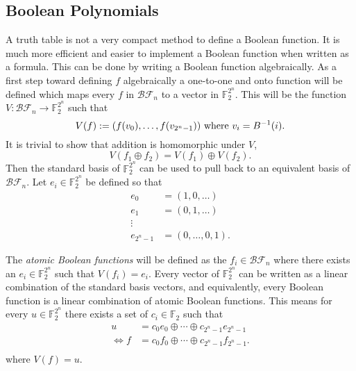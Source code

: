 \documentclass[english]{article}
\def\gftwo{\mathbb{F}_2}
\def\BF{\mathcal{BF}}
\theoremstyle{plain}
\theoremstyle{definition}
\theoremstyle{remark}
\begin{document}
\subsection{Boolean Polynomials}
\par A truth table is not a very compact method to define a Boolean
function. It is much more efficient and easier to implement a Boolean
function when written as a formula. This can be done by writing a Boolean
function algebraically. As a first step toward defining $f$ algebraically a
one-to-one and onto function will be defined which maps every $f$ in
$\BF_n$ to a vector in $\gftwo^{2^n}$. This will be the function
$V:\BF_n\rightarrow\gftwo^{2^n}$ such that
\begin{equation}\label{eqn:bool-vector}
  V(f)
    :=(f(v_0),\dots,f(v_{2^n-1}))\ {\rm where\ } v_i=B^{-1}(i).
\end{equation}
It is trivial to show that addition is homomorphic under $V$,
\[
V(f_1\oplus f_2)=V(f_1)\oplus V(f_2).
\]
Then the standard basis of $\gftwo^{2^n}$ can be used to pull back to an
equivalent basis of $\BF_n$. Let $e_i\in\gftwo^{2^n}$ be defined so that
\begin{align*}
  e_0&=(1,0,\dots)\\
  e_1&=(0,1,\dots)\\
  \vdots \\
  e_{2^n-1}&=(0,\dots,0,1).
\end{align*}
\par The {\em atomic Boolean functions} will be defined as the
$f_i\in\BF_n$ where there exists an $e_i\in\gftwo^{2^n}$ such that
$V(f_i)=e_i$. Every vector of $\gftwo^{2^n}$ can be written as a linear
combination of the standard basis vectors, and equivalently, every Boolean
function is a linear combination of atomic Boolean functions. This means
for every $u\in\gftwo^{2^n}$ there exists a set of $c_i\in\gftwo$ such that
\begin{align*}
  u  &=c_0e_0\oplus\cdots\oplus c_{2^n-1}e_{2^n-1} \\
  \Leftrightarrow f &=c_0f_0\oplus\cdots\oplus c_{2^n-1}f_{2^n-1}.\\
\end{align*}
where $V(f)=u$.
\end{document}
